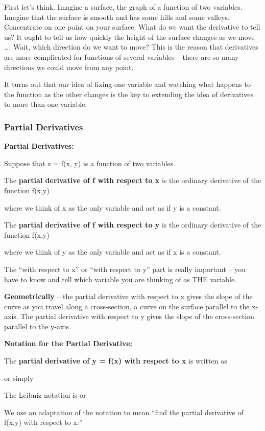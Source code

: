 First let's think. Imagine a surface, the graph of a function of two
variables. Imagine that the surface is smooth and has some hills and
some valleys. Concentrate on one point on your surface. What do we want
the derivative to tell us? It ought to tell us how quickly the height of
the surface changes as we move \ldots{}. Wait, which direction do we
want to move? This is the reason that derivatives are more complicated
for functions of several variables -- there are so many directions we
could move from any point.

It turns out that our idea of fixing one variable and watching what
happens to the function as the other changes is the key to extending the
idea of derivatives to more than one variable.

\subsubsection{Partial Derivatives}\label{partial-derivatives}

\textbf{Partial Derivatives:}

Suppose that z = f(x, y) is a function of two variables.

The \textbf{partial derivative of f with respect to x} is the ordinary
derivative of the function f(x,y)

where we think of x as the only variable and act as if y is a constant.

The \textbf{partial derivative of f with respect to y} is the ordinary
derivative of the function f(x,y)

where we think of y as the only variable and act as if x is a constant.

The ``with respect to x'' or ``with respect to y'' part is really
important -- you have to know and tell which variable you are thinking
of as THE variable.

\textbf{Geometrically} -- the partial derivative with respect to x gives
the slope of the curve as you travel along a cross-section, a curve on
the surface parallel to the x-axis. The partial derivative with respect
to y gives the slope of the cross-section parallel to the y-axis.

\textbf{Notation for the Partial Derivative:}

The \textbf{partial} \textbf{derivative of y = f(x) with respect to x}
is written as

or simply

The Leibniz notation is or

We use an adaptation of the notation to mean ``find the partial
derivative of f(x,y) with respect to x:''


